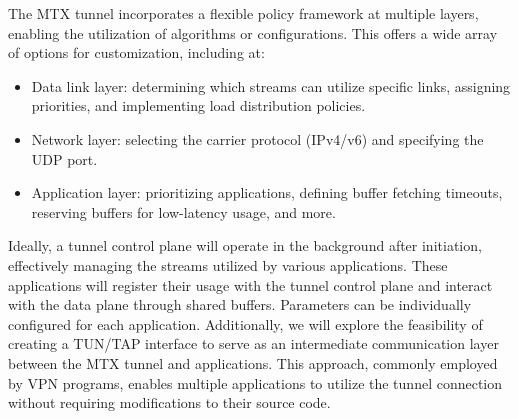 The MTX tunnel incorporates a flexible policy framework at multiple layers, enabling the utilization of algorithms or configurations. 
This offers a wide array of options for customization, including at:
\begin{itemize}
	\item Data link layer: determining which streams can utilize specific links, assigning priorities, and implementing load distribution policies.
	\item Network layer: selecting the carrier protocol (IPv4/v6) and specifying the UDP port.
	\item Application layer: prioritizing applications, defining buffer fetching timeouts, reserving buffers for low-latency usage, and more.
\end{itemize}

Ideally, a tunnel control plane will operate in the background after initiation, effectively managing the streams utilized by various applications. 
These applications will register their usage with the tunnel control plane and interact with the data plane through shared buffers. 
Parameters can be individually configured for each application.
Additionally, we will explore the feasibility of creating a TUN/TAP interface to serve as an intermediate communication layer between the MTX tunnel and applications. 
This approach, commonly employed by VPN programs, enables multiple applications to utilize the tunnel connection without requiring modifications to their source code.

